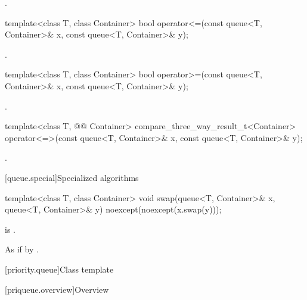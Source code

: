 \begin{itemdescr}
\pnum
\returns
{}.
\end{itemdescr}

%
\begin{itemdecl}
template<class T, class Container>
  bool operator<=(const queue<T, Container>& x, const queue<T, Container>& y);
\end{itemdecl}

\begin{itemdescr}
\pnum
\returns
{}.
\end{itemdescr}

%
\begin{itemdecl}
template<class T, class Container>
    bool operator>=(const queue<T, Container>& x,
                    const queue<T, Container>& y);
\end{itemdecl}

\begin{itemdescr}
\pnum
\returns
{}.
\end{itemdescr}

%
\begin{itemdecl}
template<class T, @@ Container>
  compare_three_way_result_t<Container>
    operator<=>(const queue<T, Container>& x, const queue<T, Container>& y);
\end{itemdecl}

\begin{itemdescr}
\pnum
\returns
{}.
\end{itemdescr}

[queue.special]{Specialized algorithms}

%
\begin{itemdecl}
template<class T, class Container>
  void swap(queue<T, Container>& x, queue<T, Container>& y) noexcept(noexcept(x.swap(y)));
\end{itemdecl}

\begin{itemdescr}
\pnum
\constraints
{} is .

\pnum
\effects
As if by .
\end{itemdescr}

[priority.queue]{Class template }

[priqueue.overview]{Overview}

